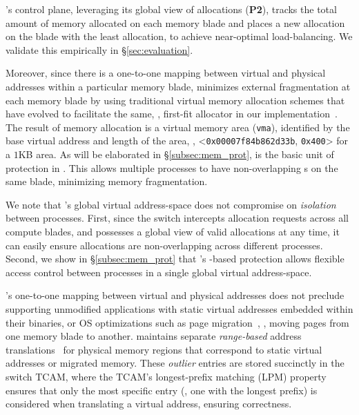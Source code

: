  \mind's control plane, leveraging its global view of allocations (\textbf{P2}), tracks the total amount of memory allocated on each memory blade and places a new allocation on the blade with the least allocation, to achieve near-optimal load-balancing. We validate this empirically in \S\ref{sec:evaluation}.

Moreover, since there is a one-to-one mapping between virtual and physical addresses within a particular memory blade, \mind minimizes external fragmentation at each memory blade by using traditional virtual memory allocation schemes that have evolved to facilitate the same, \eg, first-fit allocator in our implementation~\cite{firstfit}.
The result of memory allocation is a virtual memory area (\texttt{vma}), identified by the base virtual address and length of the area, \eg, 
  {{\small <\texttt{0x00007f84b862d33b}, \texttt{0x400}>}}
for a $1$KB area. 
As will be elaborated in \S\ref{subsec:mem_prot},  is the basic unit of protection in \mind.
This allows multiple processes to have non-overlapping s on the same blade, minimizing memory fragmentation.
 
 We note that \mindx's global virtual address-space does not compromise on \textit{isolation} between processes. First, since the switch intercepts allocation requests across all compute blades, and possesses a global view of valid allocations at any time, it can easily ensure allocations are non-overlapping across different processes. Second, we show in \S\ref{subsec:mem_prot} that \mind's -based protection allows flexible access control between processes in a single global virtual address-space.

 \mindx's one-to-one mapping between virtual and physical addresses does not preclude supporting unmodified applications with static virtual addresses embedded within their binaries, or OS optimizations such as page migration~\cite{pagemigrations}, \ie, moving pages from one memory blade to another. \mind maintains separate \textit{range-based} address translations~\cite{rangetranslations} for physical memory regions that correspond to static virtual addresses or migrated memory. These \textit{outlier} entries are stored succinctly in the switch TCAM, where the TCAM's longest-prefix matching (LPM) property ensures that only the most specific entry (\ie, one with the longest prefix) is considered when translating a virtual address, ensuring correctness.

